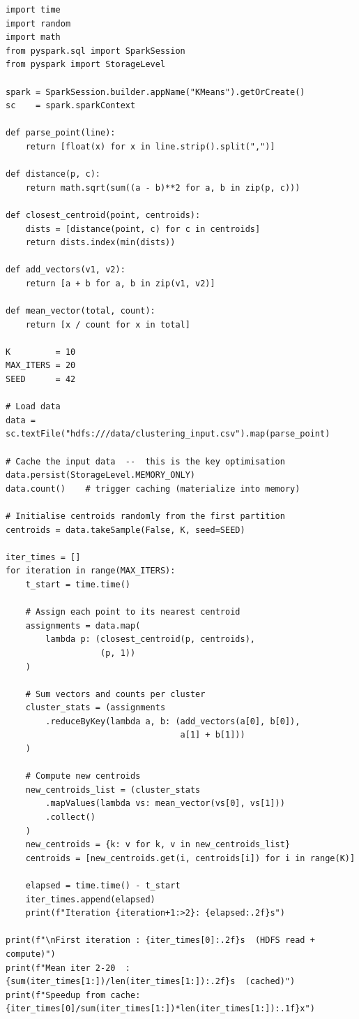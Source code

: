 \begin{lstlisting}[style=pyspark, caption={PE6.2: Iterative k-means with RDD caching}]
import time
import random
import math
from pyspark.sql import SparkSession
from pyspark import StorageLevel

spark = SparkSession.builder.appName("KMeans").getOrCreate()
sc    = spark.sparkContext

def parse_point(line):
    return [float(x) for x in line.strip().split(",")]

def distance(p, c):
    return math.sqrt(sum((a - b)**2 for a, b in zip(p, c)))

def closest_centroid(point, centroids):
    dists = [distance(point, c) for c in centroids]
    return dists.index(min(dists))

def add_vectors(v1, v2):
    return [a + b for a, b in zip(v1, v2)]

def mean_vector(total, count):
    return [x / count for x in total]

K         = 10
MAX_ITERS = 20
SEED      = 42

# Load data
data = sc.textFile("hdfs:///data/clustering_input.csv").map(parse_point)

# Cache the input data  --  this is the key optimisation
data.persist(StorageLevel.MEMORY_ONLY)
data.count()    # trigger caching (materialize into memory)

# Initialise centroids randomly from the first partition
centroids = data.takeSample(False, K, seed=SEED)

iter_times = []
for iteration in range(MAX_ITERS):
    t_start = time.time()

    # Assign each point to its nearest centroid
    assignments = data.map(
        lambda p: (closest_centroid(p, centroids),
                   (p, 1))
    )

    # Sum vectors and counts per cluster
    cluster_stats = (assignments
        .reduceByKey(lambda a, b: (add_vectors(a[0], b[0]),
                                   a[1] + b[1]))
    )

    # Compute new centroids
    new_centroids_list = (cluster_stats
        .mapValues(lambda vs: mean_vector(vs[0], vs[1]))
        .collect()
    )
    new_centroids = {k: v for k, v in new_centroids_list}
    centroids = [new_centroids.get(i, centroids[i]) for i in range(K)]

    elapsed = time.time() - t_start
    iter_times.append(elapsed)
    print(f"Iteration {iteration+1:>2}: {elapsed:.2f}s")

print(f"\nFirst iteration : {iter_times[0]:.2f}s  (HDFS read + compute)")
print(f"Mean iter 2-20  : {sum(iter_times[1:])/len(iter_times[1:]):.2f}s  (cached)")
print(f"Speedup from cache: {iter_times[0]/sum(iter_times[1:])*len(iter_times[1:]):.1f}x")
\end{lstlisting}

